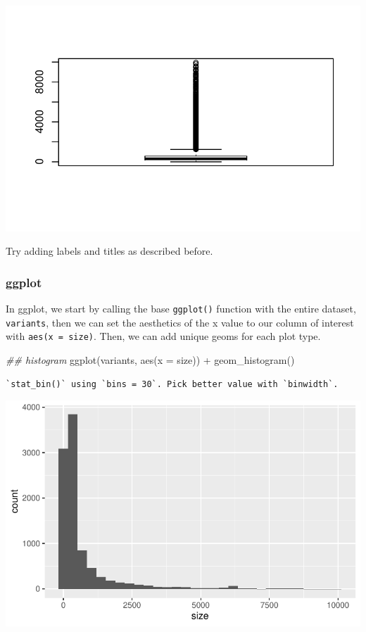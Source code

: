 \documentclass[
  letterpaper,
  DIV=11,
  numbers=noendperiod]{scrreprt}
\newenvironment{Shaded}{\begin{snugshade}}{\end{snugshade}}
\newcommand{\AttributeTok}[1]{\textcolor[rgb]{0.40,0.45,0.13}{#1}}
\newcommand{\DocumentationTok}[1]{\textcolor[rgb]{0.37,0.37,0.37}{\textit{#1}}}
\newcommand{\FunctionTok}[1]{\textcolor[rgb]{0.28,0.35,0.67}{#1}}
\newcommand{\NormalTok}[1]{\textcolor[rgb]{0.00,0.23,0.31}{#1}}
\newcommand{\SpecialCharTok}[1]{\textcolor[rgb]{0.37,0.37,0.37}{#1}}
\begin{document}
\includegraphics{scripts/02_dataViz/class3_files/figure-pdf/unnamed-chunk-13-3.pdf}

Try adding labels and titles as described before.

\subsubsection{ggplot}\label{ggplot-1}

In ggplot, we start by calling the base \texttt{ggplot()} function with
the entire dataset, \texttt{variants}, then we can set the aesthetics of
the x value to our column of interest with \texttt{aes(x\ =\ size)}.
Then, we can add unique geoms for each plot type.

\begin{Shaded}
\begin{Highlighting}[]
\DocumentationTok{\#\# histogram}
\FunctionTok{ggplot}\NormalTok{(variants, }\FunctionTok{aes}\NormalTok{(}\AttributeTok{x =}\NormalTok{ size)) }\SpecialCharTok{+}
  \FunctionTok{geom\_histogram}\NormalTok{()}
\end{Highlighting}
\end{Shaded}

\begin{verbatim}
`stat_bin()` using `bins = 30`. Pick better value with `binwidth`.
\end{verbatim}

\includegraphics{scripts/02_dataViz/class3_files/figure-pdf/unnamed-chunk-14-1.pdf}
\end{document}
